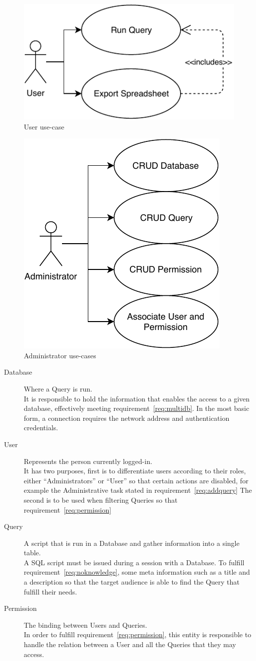 \begin{figure}[h]
  \centering
  \includegraphics[width=.5\textwidth]{images/diagramas/userusecase}
  \caption{User use-case}\label{fig:userusecase}
\end{figure}

\begin{figure}[h]
  \centering
  \includegraphics[width=.5\textwidth]{images/diagramas/adminusecase}
  \caption{Administrator use-cases}\label{fig:adminusecases}
\end{figure}

\begin{description}
\item[Database] Where a Query is run.\\
  It is responsible to hold the information that enables the access to a given database, effectively meeting requirement~\ref{req:multidb}.
  In the most basic form, a connection requires the network address and authentication credentials.
\item[User] Represents the person currently logged-in.\\
  It has two purposes, first is to differentiate users according to their roles, either ``Administrators'' or ``User'' so that certain actions are disabled, for example the Administrative task stated in requirement~\ref{req:addquery}
  The second is to be used when filtering Queries so that requirement~\ref{req:permission}
\item[Query] A script that is run in a Database and gather information into a single table.\\
  A \gls{SQL} script must be issued during a session with a Database.
  To fulfill requirement~\ref{req:noknowledge}, some meta information such as a title and a description so that the target audience is able to find the Query that fulfill their needs.
\item[Permission] The binding between Users and Queries.\\
  In order to fulfill requirement~\ref{req:permission}, this entity is responsible to handle the relation between a User and all the Queries that they may access.
\end{description}

